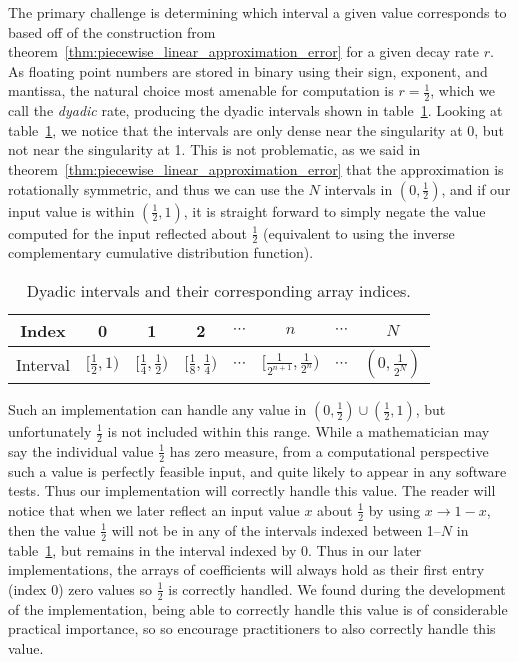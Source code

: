 \documentclass[manuscript,review]{acmart}
\begin{document}
The primary challenge is determining which interval a given value corresponds to based off of the construction from theorem~\ref{thm:piecewise_linear_approximation_error} for a given decay rate $ r $. As floating point numbers are stored in binary using their sign, exponent, and mantissa, the natural choice most amenable for computation is $ r = \tfrac{1}{2} $, which we call the \emph{dyadic} rate, producing the dyadic intervals shown in table~\ref{tab:dyadic_intervals}. Looking at table~\ref{tab:dyadic_intervals}, we notice that the intervals are only dense near the singularity at 0, but not near the singularity at 1. This is not problematic, as we said in theorem~\ref{thm:piecewise_linear_approximation_error} that the approximation is rotationally symmetric, and thus we can use the $ N $ intervals in $ (0, \tfrac{1}{2}) $, and if our input value is within $ (\tfrac{1}{2}, 1) $, it is straight forward to simply negate the value computed for the input reflected about $ \tfrac{1}{2} $ (equivalent to using the inverse complementary cumulative distribution function). 

\begin{table}[htb]
\centering
\caption{Dyadic intervals and their corresponding array indices.}
\label{tab:dyadic_intervals}
\renewcommand{\arraystretch}{1.4}  %
\begin{tabular}{c|ccccccc}
Index & 0 & 1 & 2 & $ \cdots $ & $ n $ & $ \cdots $ & $ N $ \\ \hline
Interval & $ [\tfrac{1}{2}, 1) $ & $ [\tfrac{1}{4}, \tfrac{1}{2}) $ & $ [\tfrac{1}{8}, \tfrac{1}{4}) $ & $ \cdots $ & $ [\tfrac{1}{2^{n+1}}, \tfrac{1}{2^n}) $ & $ \cdots $ & $ (0, \tfrac{1}{2^N}) $
\end{tabular}
\end{table}

Such an implementation can handle any value in $ (0, \tfrac{1}{2}) \cup (\tfrac{1}{2}, 1) $, but unfortunately $ \tfrac{1}{2} $ is not included within this range. While a mathematician may say the individual value $ \tfrac{1}{2} $ has zero measure, from a computational perspective such a value is perfectly feasible input, and quite likely to appear in any software tests. Thus our implementation will correctly handle this value. The reader will notice that when we later reflect an input value $ x $ about $ \tfrac{1}{2} $ by using $ x \to 1 - x $, then the value $ \tfrac{1}{2} $ will not be in any of the intervals indexed between 1--$ N $ in table~\ref{tab:dyadic_intervals}, but remains in the interval indexed by 0. Thus in our later implementations, the arrays of coefficients will always hold as their first entry (index 0) zero values so $ \tfrac{1}{2} $ is correctly handled. We found during the development of the implementation, being able to correctly handle this value is of considerable practical importance, so so encourage practitioners to also correctly handle this value. 
\end{document}
